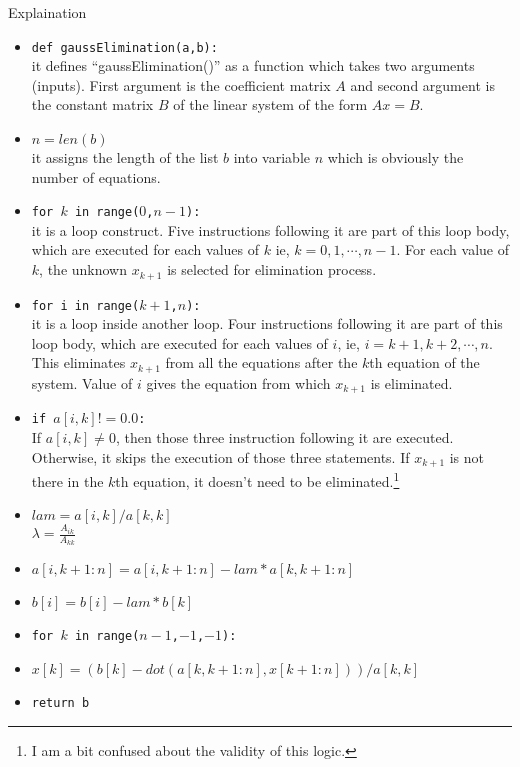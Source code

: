 \begin{remark}Explaination
\begin{commentary}
\begin{itemize}
	\item \texttt{def gaussElimination(a,b):}\\ it defines ``gaussElimination()'' as a function which takes two arguments (inputs). First argument is the coefficient matrix $A$ and second argument is the constant matrix $B$ of the linear system of the form $Ax = B$.
	\item \texttt{$n = len(b)$}\\ it assigns the length of the list $b$ into variable $n$ which is obviously the number of equations.
	\item \texttt{for $k$ in range($0$,$n-1$):}  \\ it is a loop construct. Five instructions following it are part of this loop body, which are executed for each values of $k$ ie, $k = 0, 1, \cdots, n-1$. For each value of $k$, the unknown $x_{k+1}$ is selected for elimination process.
	\item \texttt{for i in range($k+1$,$n$):}\\ it is a loop inside another loop. Four instructions following it are part of this loop body, which are executed for each values of $i$, ie, $i = k+1, k+2, \cdots, n$. This eliminates $x_{k+1}$ from all the equations after the $k$th equation of the system. Value of $i$ gives the equation from which $x_{k+1}$ is eliminated.
	\item \texttt{if $a[i,k] != 0.0$:} \\ If $a[i,k] \ne 0$, then those three instruction following it are executed. Otherwise, it skips the execution of those three statements. If $x_{k+1}$ is not there in the $k$th equation, it doesn't need to be eliminated.\footnote{I am a bit confused about the validity of this logic.}
	\item \texttt{$lam = a[i,k]/a[k,k]$} \\ $\lambda = \frac{A_{ik}}{A_{kk}}$
	\item \texttt{$a[i,k+1:n] = a[i,k+1:n]-lam*a[k,k+1:n]$}
	\item \texttt{$b[i] = b[i]-lam*b[k]$}
	\item \texttt{for $k$ in range($n-1$,$-1$,$-1$):}
	\item \texttt{$x[k] = (b[k]-dot(a[k,k+1:n],x[k+1:n]))/a[k,k]$}
	\item \texttt{return b}
\end{itemize}
\end{commentary}
\end{remark}

